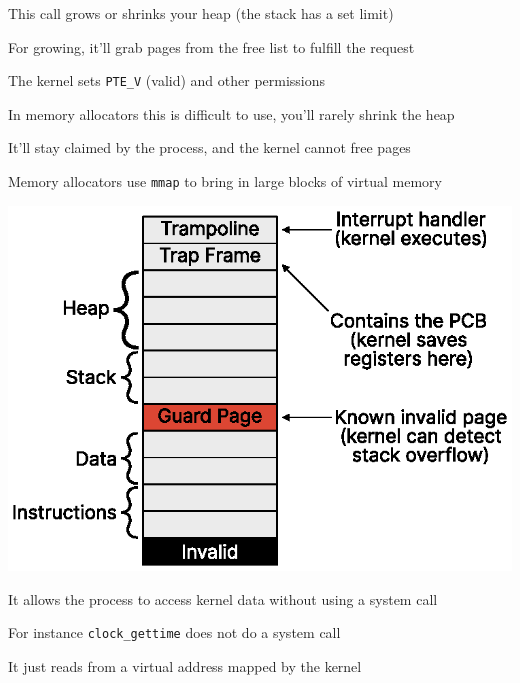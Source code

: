 \begin{slide}


    This call grows or shrinks your heap (the stack has a set limit)
    \medskip

    For growing, it'll grab pages from the free list to fulfill the request

    \leftspace{}The kernel sets \texttt{PTE\_V} (valid) and other permissions
    \medskip

    In memory allocators this is difficult to use, you'll rarely shrink the heap

    \leftspace{}It'll stay claimed by the process, and the kernel cannot free
    pages
    \medskip

    Memory allocators use \texttt{mmap} to bring in large blocks of virtual
    memory

\end{slide}

\begin{slide}


    \centering
    \includegraphics{address-space.eps}

\end{slide}

\begin{slide}


    It allows the process to access kernel data without using
    a system call
    \medskip

    For instance \texttt{clock\_gettime} does not do a system call

    \leftspace{}It just reads from a virtual address mapped by the kernel

\end{slide}

